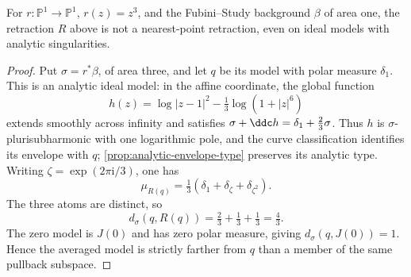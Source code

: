 \begin{example}\label{finite-curve:averaging-not-nearest}
For $r:\mathbb P^1\to\mathbb P^1$, $r(z)=z^3$, and the
Fubini--Study background $\beta$ of area one, the retraction
$R$ above is not a nearest-point retraction, even on ideal
models with analytic singularities.
\end{example}
\begin{proof}
Put $\sigma=r^*\beta$, of area three, and let $q$ be its model
with polar measure $\delta_1$. This is an analytic ideal model:
in the affine coordinate, the global function
\[
 h(z)=\log|z-1|^2-\tfrac13\log(1+|z|^6)
\]
extends smoothly across infinity and satisfies
$\sigma+\ddc h=\delta_1+\tfrac23\sigma$.
Thus $h$ is $\sigma$-plurisubharmonic with one logarithmic pole,
and the curve classification identifies its envelope with $q$;
\cref{prop:analytic-envelope-type} preserves its analytic type.
Writing $\zeta=\exp(2\pi\mathrm i/3)$, one has
\[
 \mu_{R(q)}=\tfrac13(\delta_1+\delta_\zeta+\delta_{\zeta^2}).
\]
The three atoms are distinct, so
\[
 d_\sigma(q,R(q))=\tfrac23+\tfrac13+\tfrac13=\tfrac43.
\]
The zero model is $J(0)$ and has zero polar measure, giving
$d_\sigma(q,J(0))=1$. Hence the averaged model is strictly
farther from $q$ than a member of the same pullback subspace.
\end{proof}
